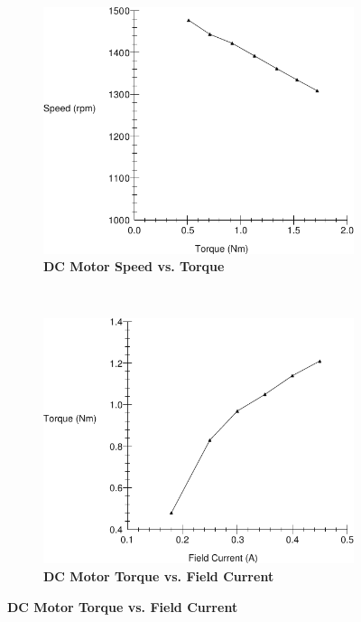 \documentclass{article}
\begin{document}
\begin{figure}[H]
  \centering
  \begin{subfigure}[b]{0.45\textwidth}
    \includegraphics[width=\textwidth]{img/plot4}
    \caption{\textbf{DC Motor Speed vs. Torque}}
    \label{fig:plot4}
  \end{subfigure}~%
%
  \begin{subfigure}[b]{0.45\textwidth}
    \includegraphics[width=\textwidth]{img/plot5}
    \caption{\textbf{DC Motor Torque vs. Field Current}}
    \label{fig:plot5}
  \end{subfigure}
\end{figure}
\end{document}
